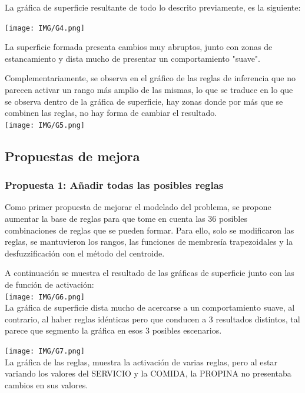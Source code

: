 \documentclass[11pt, letterpaper]{article}
\begin{document}
	La gráfica de superficie resultante de todo lo descrito previamente, es la siguiente:
	
	\texttt{[image: IMG/G4.png]}
	
	La superficie formada presenta cambios muy abruptos, junto con zonas de estancamiento y dista mucho de presentar un comportamiento "suave".
	
	\newpage
	
	Complementariamente, se observa en el gráfico de las reglas de inferencia que no parecen activar un rango más amplio de las mismas, lo que se traduce en lo que se observa dentro de la gráfica de superficie, hay zonas donde por más que se combinen las reglas, no hay forma de cambiar el resultado. \\
	
	
	\texttt{[image: IMG/G5.png]}
	
	
	
	
	\newpage
	
	\subsection{Propuestas de mejora}
	\subsubsection{Propuesta 1: Añadir todas las posibles reglas}
	
	Como primer propuesta de mejorar el modelado del problema, se propone aumentar la base de reglas para que tome en cuenta las 36 posibles combinaciones de reglas que se pueden formar. Para ello, solo se modificaron las reglas, se mantuvieron los rangos, las funciones de membresía trapezoidales y la desfuzzificación con el método del centroide.
	
	A continuación se muestra el resultado de las gráficas de superficie junto con las de función de activación: \\
	
	
	\texttt{[image: IMG/G6.png]} \\
	
	La gráfica de superficie dista mucho de acercarse a un comportamiento suave, al contrario, al haber reglas idénticas pero que conducen a 3 resultados distintos, tal parece que segmento la gráfica en esos 3 posibles escenarios.
	
	\texttt{[image: IMG/G7.png]} \\
	
	La gráfica de las reglas, muestra la activación de varias reglas, pero al estar variando los valores del SERVICIO y la COMIDA, la PROPINA no presentaba cambios en sus valores.
	
\end{document}
